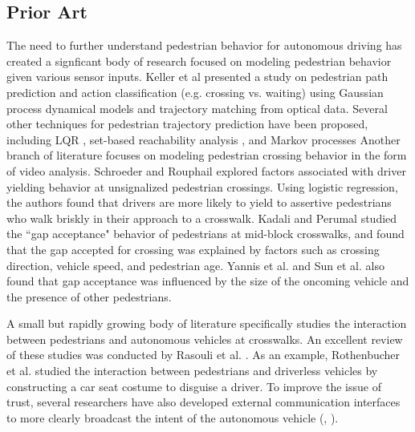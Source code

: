 \documentclass[letterpaper, 10 pt, conference]{ieeeconf}  %
\begin{document}
\subsection{Prior Art}

The need to further understand pedestrian behavior for autonomous driving has created a signficant body of research focused on modeling pedestrian behavior given various sensor inputs. Keller et al \cite{Keller2014} presented a study on pedestrian path prediction and action classification (e.g. crossing vs. waiting) using Gaussian process dynamical models and trajectory matching from optical data. Several other techniques for pedestrian trajectory prediction have been proposed, including LQR \cite{Batkovic}, set-based reachability analysis \cite{Koschi2018}, and Markov processes \cite{Karasev2016} Another branch of literature focuses on modeling pedestrian crossing behavior in the form of  video analysis. Schroeder and Rouphail \cite{Schroeder2011} explored factors associated with driver yielding behavior at unsignalized pedestrian crossings. Using logistic regression, the authors found that drivers are more likely to yield to assertive pedestrians who walk briskly in their approach to a crosswalk. Kadali and Perumal \cite{RaghuramKadali2012} studied the ``gap acceptance" behavior of pedestrians at mid-block crosswalks, and found that the gap accepted for crossing was explained by factors such as crossing direction, vehicle speed, and pedestrian age. Yannis et al. \cite{Yannis2013} and Sun et al.\cite{Sun2002} also found that gap acceptance was influenced by the size of the oncoming vehicle and the presence of other pedestrians. 

A small but rapidly growing body of literature specifically studies the interaction between pedestrians and autonomous vehicles at crosswalks. An excellent review of these studies was conducted by Rasouli et al. \cite{Rasouli}. As an example, Rothenbucher et al. \cite{Rothenbucher2016} studied the interaction between pedestrians and driverless vehicles by constructing a car seat costume to disguise a driver. To improve the issue of trust, several researchers have also developed external communication interfaces to more clearly broadcast the intent of the autonomous vehicle (\cite{Matthews}, \cite{Lagstrom2015}). 
\end{document}
